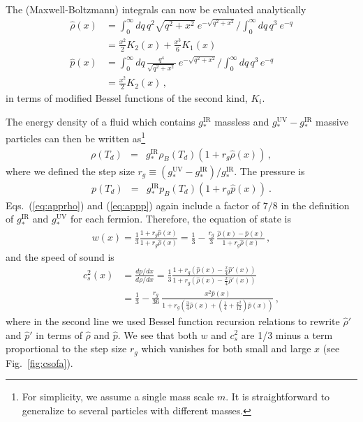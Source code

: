 \documentclass[aps,prd,twocolumn,nofootinbib,superscriptaddress]{revtex4}
\newcommand{\Fig}[1]{Fig.~\ref{fig:#1}}
\def\bea{\begin{eqnarray}}
\def\eea{\end{eqnarray}}
\begin{document}
The (Maxwell-Boltzmann) integrals can now be evaluated analytically 
\begin{align}
\label{eq:rhohat}
\hat\rho(x) &= \int_0^\infty\!\!\!\! dq\, q^2 \sqrt{q^2+x^2}\ e^{-\sqrt{q^2+x^2}} \bigg/ \int_0^\infty\!dq\, q^3 \ e^{-q}
\nonumber \\
&= \frac{x^2}{2} K_2(x)+\frac{x^3}{6} K_1(x)
\nonumber \\
\hat p(x) &=  \int_0^\infty\!\!\!\! dq \, \frac{q^4}{\sqrt{q^2+x^2}}\ e^{-\sqrt{q^2+x^2}} \bigg/  \int_0^\infty\!\!\!\! dq \, q^3\, e^{-q}
\nonumber \\
&= \frac{x^2}{2} K_2(x)
\, ,
\end{align}
in terms of modified Bessel functions of the second kind, $K_i$.

The energy density of a fluid which contains $g_*^\text{IR}$ massless and $g_*^\text{UV}-g_*^\text{IR}$ massive particles can then be written as\footnote{For simplicity, we assume a single mass scale $m$. It is straightforward to generalize to several particles with different masses.}
\bea
\label{eq:apprho}
\rho(T_d) 
&=& g_*^\text{IR} \rho_B(T_d) (1+r_g \hat\rho(x))
\, ,
\eea
where we defined the step size $r_g\equiv (g_*^\text{UV}-g_*^\text{IR})/g_*^\text{IR}$. The pressure is
\bea
\label{eq:appp}
p(T_d)&=& g_*^\text{IR} p_B(T_d) (1+r_g\hat p(x)) \ .
\eea
Eqs.~(\ref{eq:apprho}) and (\ref{eq:appp}) again include a factor of $7/8$ in the definition of $g_*^\text{IR}$ and $g_*^\text{UV}$ for each fermion. Therefore, the equation of state is
\bea
\label{eq:w}
w(x)=
\frac13 \frac{1+r_g\hat p(x)}{1+r_g\hat \rho(x)} 
=\frac13 -\frac{r_g}{3}\, \frac{\hat\rho(x) - \hat p(x)}{1+r_g\hat \rho(x)} 
\, ,
\eea
and the speed of sound is
\begin{align}
\label{eq:cs2}
c_s^2(x)&=\frac{dp/dx}{d\rho/dx}
=\frac13 \frac{1+r_g (\hat p(x) -\frac{x}{4} \hat p'(x))}{1+r_g (\hat \rho(x) -\frac{x}{4} \hat \rho'(x))}
\nonumber \\
&=\frac13-\frac{r_g}{36}\, \frac{x^2 \hat p(x)}{1+r_g (\frac34\hat \rho(x) +(\frac14+\frac{x^2}{12})\hat p(x))}
\, ,
\end{align}
where in the second line we used Bessel function recursion relations to rewrite $\hat \rho'$ and $\hat p'$ in terms of $\hat \rho$ and $\hat p$. We see that both $w$ and $c_s^2$ are 1/3 minus a term proportional to the step size $r_g$ which vanishes for both small and large $x$ (see \Fig{csofa}).
\end{document}
